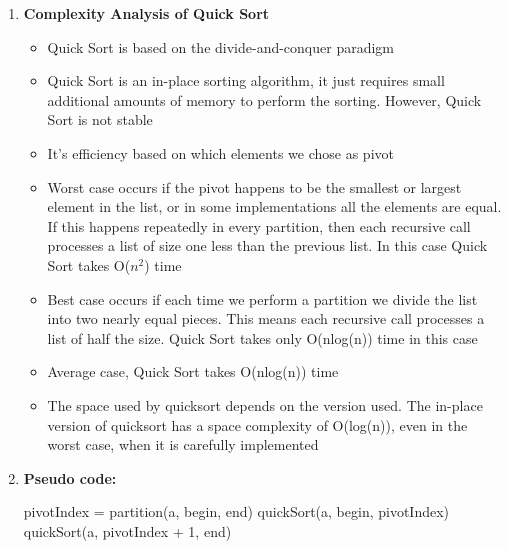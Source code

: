 \documentclass[11pt,a4paper]{article}
\begin{document}
{\begin{enumerate}[label=\textbf{\arabic*})]
					Quick Sort picks an element as pivot and partitions the given array around the picked pivot. Then, it sorts the parts independently. Finally, it combines the sorted subsequences by a simple concatenation.
				\\[12pt]
				\item \textbf{Complexity Analysis of Quick Sort}
					\begin{itemize}
					\item Quick Sort is based on the divide-and-conquer paradigm
                    \item Quick Sort is an in-place sorting algorithm, it just requires small additional amounts of memory to perform the sorting. However, Quick Sort is not stable
                    \item It’s efficiency based on which elements we chose as pivot
                    \item Worst case occurs if the pivot happens to be the smallest or largest element in the list, or in some implementations all the elements are equal. If this happens repeatedly in every partition, then each recursive call processes a list of size one less than the previous list. In this case Quick Sort takes O($n^2$) time
                    \item Best case occurs if each time we perform a partition we divide the list into two nearly equal pieces. This means each recursive call processes a list of half the size. Quick Sort takes only O(nlog(n)) time in this case
                    \item Average case, Quick Sort takes O(nlog(n)) time
                    \item The space used by quicksort depends on the version used. The in-place version of quicksort has a space complexity of O(log(n)), even in the worst case, when it is carefully implemented
                    \end{itemize}
				\item \textbf{Pseudo code:} 
				\begin{algorithm}[H]
            	\begin{algorithmic}[1]
            			\State pivotIndex = partition(a, begin, end)
            			\State quickSort(a, begin, pivotIndex)
            			\State quickSort(a, pivotIndex + 1, end)
            		\EndProcedure
            		

\end{algorithmic}
\end{algorithm}
\end{enumerate}}
\end{document}
